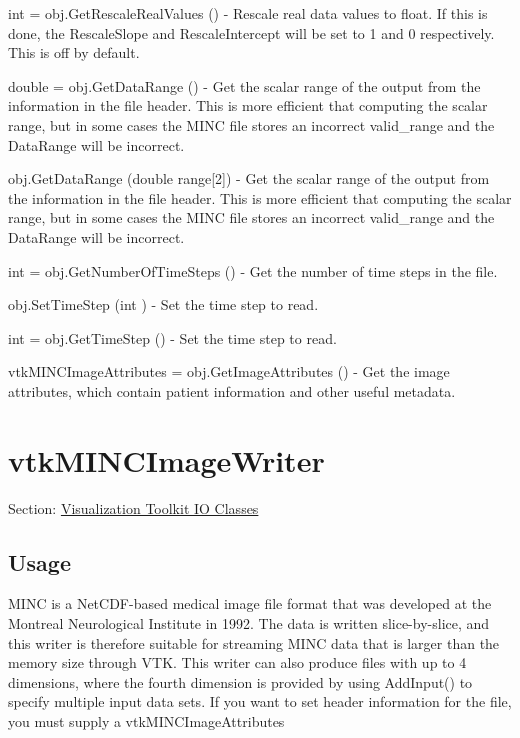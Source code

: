 \begin{DoxyItemize}
\item {\ttfamily int = obj.\-Get\-Rescale\-Real\-Values ()} -\/ Rescale real data values to float. If this is done, the Rescale\-Slope and Rescale\-Intercept will be set to 1 and 0 respectively. This is off by default.  
\item {\ttfamily double = obj.\-Get\-Data\-Range ()} -\/ Get the scalar range of the output from the information in the file header. This is more efficient that computing the scalar range, but in some cases the M\-I\-N\-C file stores an incorrect valid\-\_\-range and the Data\-Range will be incorrect.  
\item {\ttfamily obj.\-Get\-Data\-Range (double range\mbox{[}2\mbox{]})} -\/ Get the scalar range of the output from the information in the file header. This is more efficient that computing the scalar range, but in some cases the M\-I\-N\-C file stores an incorrect valid\-\_\-range and the Data\-Range will be incorrect.  
\item {\ttfamily int = obj.\-Get\-Number\-Of\-Time\-Steps ()} -\/ Get the number of time steps in the file.  
\item {\ttfamily obj.\-Set\-Time\-Step (int )} -\/ Set the time step to read.  
\item {\ttfamily int = obj.\-Get\-Time\-Step ()} -\/ Set the time step to read.  
\item {\ttfamily vtk\-M\-I\-N\-C\-Image\-Attributes = obj.\-Get\-Image\-Attributes ()} -\/ Get the image attributes, which contain patient information and other useful metadata.  
\end{DoxyItemize}\hypertarget{vtkio_vtkmincimagewriter}{}\section{vtk\-M\-I\-N\-C\-Image\-Writer}\label{vtkio_vtkmincimagewriter}
Section\-: \hyperlink{sec_vtkio}{Visualization Toolkit I\-O Classes} \hypertarget{vtkwidgets_vtkxyplotwidget_Usage}{}\subsection{Usage}\label{vtkwidgets_vtkxyplotwidget_Usage}
M\-I\-N\-C is a Net\-C\-D\-F-\/based medical image file format that was developed at the Montreal Neurological Institute in 1992. The data is written slice-\/by-\/slice, and this writer is therefore suitable for streaming M\-I\-N\-C data that is larger than the memory size through V\-T\-K. This writer can also produce files with up to 4 dimensions, where the fourth dimension is provided by using Add\-Input() to specify multiple input data sets. If you want to set header information for the file, you must supply a vtk\-M\-I\-N\-C\-Image\-Attributes

